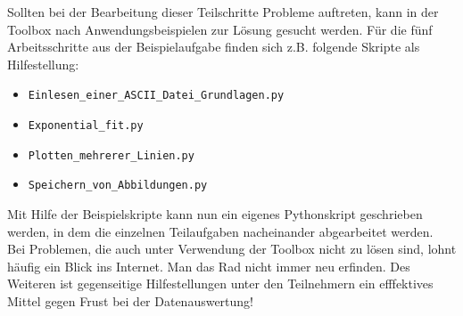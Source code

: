 \documentclass[a4paper,fleqn]{article}
\begin{document}
Sollten bei der Bearbeitung dieser Teilschritte Probleme auftreten, kann in der
Toolbox nach Anwendungsbeispielen zur Lösung gesucht werden. Für die fünf
Arbeitsschritte aus der Beispielaufgabe finden sich z.B. folgende Skripte als
Hilfestellung:

\begin{itemize}
  \item \verb+Einlesen_einer_ASCII_Datei_Grundlagen.py+
  \item \verb+Exponential_fit.py+
  \item \verb+Plotten_mehrerer_Linien.py+
  \item \verb+Speichern_von_Abbildungen.py+
\end{itemize}

Mit Hilfe der Beispielskripte kann nun ein eigenes Pythonskript geschrieben
werden, in dem die einzelnen Teilaufgaben nacheinander abgearbeitet
werden.\\

Bei Problemen, die auch unter Verwendung der Toolbox nicht zu lösen sind, lohnt
häufig ein Blick ins Internet. Man das Rad nicht immer neu erfinden. Des
Weiteren ist gegenseitige Hilfestellungen unter den Teilnehmern ein efffektives
Mittel gegen Frust bei der Datenauswertung!
\end{document}
